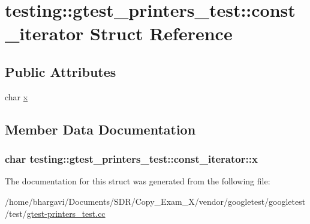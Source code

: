 \hypertarget{structtesting_1_1gtest__printers__test_1_1const__iterator}{}\section{testing\+:\+:gtest\+\_\+printers\+\_\+test\+:\+:const\+\_\+iterator Struct Reference}
\label{structtesting_1_1gtest__printers__test_1_1const__iterator}
\subsection*{Public Attributes}
\begin{DoxyCompactItemize}
\item 
char \hyperlink{structtesting_1_1gtest__printers__test_1_1const__iterator_a4412dbc1c37c2bc5211971f0c8176d6b}{x}
\end{DoxyCompactItemize}


\subsection{Member Data Documentation}
\subsubsection[{\texorpdfstring{x}{x}}]{\setlength{\rightskip}{0pt plus 5cm}char testing\+::gtest\+\_\+printers\+\_\+test\+::const\+\_\+iterator\+::x}\hypertarget{structtesting_1_1gtest__printers__test_1_1const__iterator_a4412dbc1c37c2bc5211971f0c8176d6b}{}\label{structtesting_1_1gtest__printers__test_1_1const__iterator_a4412dbc1c37c2bc5211971f0c8176d6b}


The documentation for this struct was generated from the following file\+:\begin{DoxyCompactItemize}
\item 
/home/bhargavi/\+Documents/\+S\+D\+R/\+Copy\+\_\+\+Exam\+\_\+X/vendor/googletest/googletest/test/\hyperlink{gtest-printers__test_8cc}{gtest-\/printers\+\_\+test.\+cc}\end{DoxyCompactItemize}
